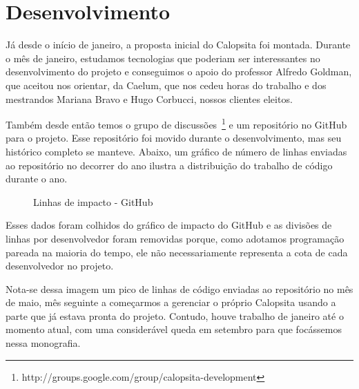 \section{Desenvolvimento}

Já desde o início de janeiro, a proposta inicial do Calopsita foi montada. Durante o mês de janeiro, estudamos tecnologias que poderiam ser interessantes no desenvolvimento do projeto e conseguimos o apoio do professor Alfredo Goldman, que aceitou nos orientar, da Caelum, que nos cedeu horas do trabalho e dos mestrandos Mariana Bravo e Hugo Corbucci, nossos clientes eleitos.

Também desde então temos o grupo de discussões~\footnote{http://groups.google.com/group/calopsita-development} e um repositório no GitHub para o projeto. Esse repositório foi movido durante o desenvolvimento, mas seu histórico completo se manteve. Abaixo, um gráfico de número de linhas enviadas ao repositório no decorrer do ano ilustra a distribuição do trabalho de código durante o ano.

\begin{figure}[htbp]
  \centering
  \caption{Linhas de impacto - GitHub}
\end{figure}

Esses dados foram colhidos do gráfico de impacto do GitHub e as divisões de linhas por desenvolvedor foram removidas porque, como adotamos programação pareada na maioria do tempo, ele não necessariamente representa a cota de cada desenvolvedor no projeto.

Nota-se dessa imagem um pico de linhas de código enviadas ao repositório no mês de maio, mês seguinte a começarmos a gerenciar o próprio Calopsita usando a parte que já estava pronta do projeto. Contudo, houve trabalho de janeiro até o momento atual, com uma considerável queda em setembro para que focássemos nessa monografia.


